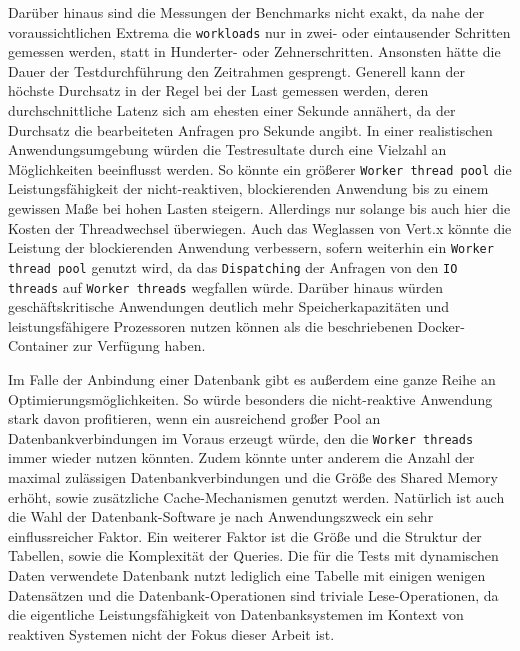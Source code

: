 Darüber hinaus sind die Messungen der Benchmarks nicht exakt, da nahe der voraussichtlichen Extrema die \verb|workloads|
nur in zwei- oder eintausender Schritten gemessen werden, statt in Hunderter- oder Zehnerschritten.
Ansonsten hätte die Dauer der Testdurchführung den Zeitrahmen gesprengt.
Generell kann der höchste Durchsatz in der Regel bei der Last gemessen werden, deren durchschnittliche Latenz sich am ehesten
einer Sekunde annähert, da der Durchsatz die bearbeiteten Anfragen pro Sekunde angibt.
\newline\newline
In einer realistischen Anwendungsumgebung würden die Testresultate durch eine Vielzahl an Möglichkeiten beeinflusst werden.
So könnte ein größerer \verb|Worker thread pool| die Leistungsfähigkeit der nicht-reaktiven, blockierenden
Anwendung bis zu einem gewissen Maße bei hohen Lasten steigern. Allerdings nur solange bis auch hier die Kosten der Threadwechsel
überwiegen. Auch das Weglassen von Vert.x könnte die Leistung der blockierenden Anwendung verbessern, sofern weiterhin
ein \verb|Worker thread pool| genutzt wird, da das \verb|Dispatching| der Anfragen von den \verb|IO threads| auf
\verb|Worker threads| wegfallen würde. Darüber hinaus würden geschäftskritische Anwendungen deutlich mehr Speicherkapazitäten und leistungsfähigere
Prozessoren nutzen können als die beschriebenen Docker-Container zur Verfügung haben.

Im Falle der Anbindung einer Datenbank gibt es außerdem eine ganze Reihe an Optimierungsmöglichkeiten.
So würde besonders die nicht-reaktive Anwendung stark davon profitieren, wenn ein ausreichend großer Pool an Datenbankverbindungen
im Voraus erzeugt würde, den die \verb|Worker threads| immer wieder nutzen könnten.
Zudem könnte unter anderem die Anzahl der maximal zulässigen
Datenbankverbindungen und die Größe des Shared Memory erhöht, sowie zusätzliche Cache-Mechanismen genutzt werden.
Natürlich ist auch die Wahl der Datenbank-Software je nach Anwendungszweck ein sehr einflussreicher Faktor.
\newline\newline
Ein weiterer Faktor ist die Größe und die Struktur der Tabellen, sowie die Komplexität der Queries.
Die für die Tests mit dynamischen Daten verwendete Datenbank nutzt lediglich eine Tabelle mit einigen wenigen Datensätzen und die
Datenbank-Operationen sind triviale Lese-Operationen,
da die eigentliche Leistungsfähigkeit von Datenbanksystemen im Kontext von reaktiven Systemen nicht der Fokus dieser Arbeit ist.


